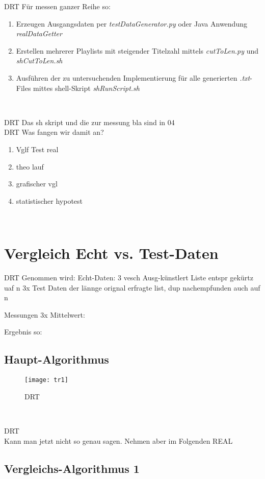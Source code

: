 \documentclass[
10pt, %
a4paper, %
oneside, %
headinclude,footinclude, %
BCOR5mm, %
]{scrartcl}
\begin{document}
DRT
Für messen ganzer Reihe so:
\begin{enumerate}[noitemsep]
	\item Erzeugen Ausgangsdaten per \textit{testDataGenerator.py} oder Java Anwendung \textit{realDataGetter}
	\item Erstellen mehrerer Playlists mit steigender Titelzahl mittels \textit{cutToLen.py} und  \textit{shCutToLen.sh}
	\item Ausführen der zu untersuchenden Implementierung für alle generierten \textit{.txt}-Files mittes shell-Skript \textit{shRunScript.sh}
\end{enumerate}\

DRT
Das sh skript und die zur messung bla sind in 04\\

DRT
Was fangen wir damit an?\\
\begin{enumerate}[noitemsep]
		\item Vglf Test real
		\item theo lauf
		\item grafischer vgl
		\item statistischer hypotest
\end{enumerate}\


\section{Vergleich Echt vs. Test-Daten}
DRT
Genommen wird:
Echt-Daten: 3 vesch Ausg-künstlert
Liste entspr gekürtz uaf n
3x Test Daten der lännge orignal erfragte list, dup nachempfunden
auch auf n 

Messungen 3x Mittelwert:

Ergebnis so:

\subsection{Haupt-Algorithmus}

\begin{figure}[h!]
	\centering 
	\texttt{[image: tr1]} 
	\caption[DRT]{DRT}
\end{figure}\

DRT\\
Kann man jetzt nicht so genau sagen.
Nehmen aber im Folgenden REAL


\subsection{Vergleichs-Algorithmus 1}
\end{document}
